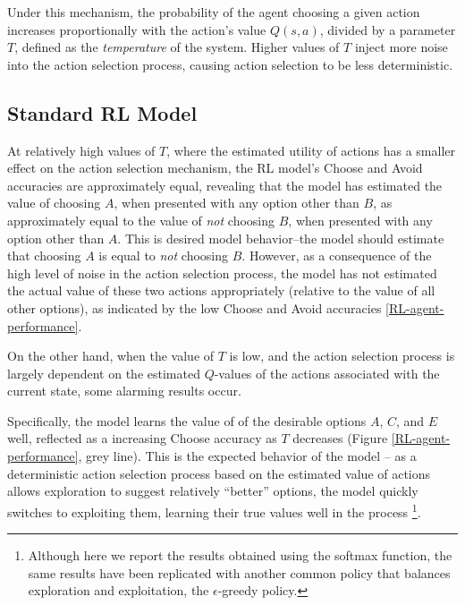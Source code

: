 \documentclass[10pt,letterpaper]{article}
\begin{document}
{\color{red} Under this mechanism, the probability of the agent choosing a given action increases proportionally with the action's value $Q(s,a)$, divided by a parameter $T$, defined as the \emph{temperature} of the system. Higher values of $T$ inject more noise into the action selection process, causing action selection to be less deterministic.

\subsection{Standard RL Model}

At relatively high values of $T$, where the estimated utility of actions has a smaller effect on the action selection mechanism, the RL model's Choose and Avoid accuracies are approximately equal, revealing that the model has estimated the value of choosing $A$, when presented with any option other than $B$, as approximately equal to the value of \emph{not} choosing $B$, when presented with any option other than $A$. This is desired model behavior--the model should estimate that choosing $A$ is equal to \emph{not} choosing $B$. However, as a consequence of the high level of noise in the action selection process, the model has not estimated the actual value of these two actions appropriately (relative to the value of all other options), as indicated by the low Choose and Avoid accuracies \ref{RL-agent-performance}. 

On the other hand, when the value of $T$ is low, and the action selection process is largely dependent on the estimated $Q$-values of the actions associated with the current state, some alarming results occur.} 

Specifically, the model learns the value of of the desirable options $A$, $C$, and $E$ well, reflected as a {\color{red} increasing} Choose accuracy as $T$ {\color{red} decreases} (Figure \ref{RL-agent-performance}, grey line). This is the expected behavior of the model -- {\color{red} as a deterministic action selection process based on the estimated value of actions allows exploration} to suggest relatively ``better'' options, the model quickly switches to exploiting them, learning their true values well in the process \footnote{Although here we report the results obtained using the {\color{red} softmax function}, the same results have been replicated with another common policy that balances exploration and exploitation, the $\epsilon$-greedy policy.}. 
\end{document}
